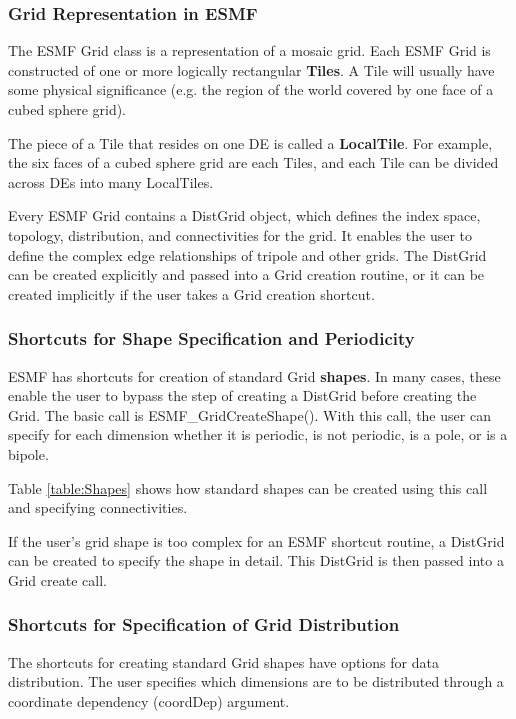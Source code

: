 \subsubsection{Grid Representation in ESMF}

The ESMF Grid class is a representation of a mosaic grid.  Each ESMF
Grid is constructed of one or more logically rectangular {\bf Tiles}.
A Tile will usually have some physical significance (e.g. the region
of the world covered by one face of a cubed sphere grid).

The piece of a Tile that resides on one DE is called a {\bf LocalTile}.
For example, the six faces of a cubed sphere grid are each Tiles, and
each Tile can be divided across DEs into many LocalTiles. 

Every ESMF Grid contains a DistGrid object, which defines the index space,
topology, distribution, and connectivities for the grid.  It enables
the user to define the complex edge relationships of tripole and other
grids.  The DistGrid can be created explicitly and passed into a Grid
creation routine, or it can be created implicitly if the user takes
a Grid creation shortcut.

\subsubsection{Shortcuts for Shape Specification and Periodicity}
\label{sec:ShapeShortcut}
ESMF has shortcuts for creation of standard Grid {\bf shapes}.  
In many cases, these enable the user to bypass the step of creating 
a DistGrid before creating the Grid.  The basic call is 
ESMF\_GridCreateShape().  With this call, the user can specify for
each dimension whether it is periodic, is not periodic, is a pole, or
is a bipole.

Table \ref{table:Shapes} shows how standard shapes can be created
using this call and specifying connectivities.

If the user's grid shape is too complex for an ESMF shortcut routine,
a DistGrid can be created to specify the shape in detail. 
This DistGrid is then passed into a Grid create call.

\subsubsection{Shortcuts for Specification of Grid Distribution} 

The shortcuts for creating standard Grid shapes have options
for data distribution.  The user specifies which dimensions 
are to be distributed through a coordinate dependency (coordDep)
argument.

